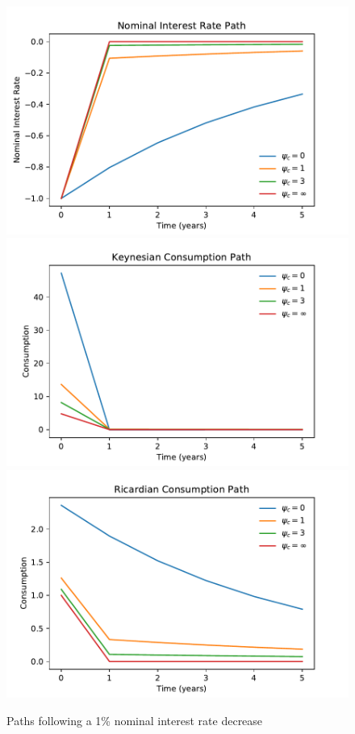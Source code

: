 \documentclass[12pt,a4paper]{article}
\begin{document}
\begin{figure} 
	\begin{centering}
		\includegraphics[scale=0.5]{../Python/DoloCode/Figures/TANK_capital_IRF_i.pdf}
		\includegraphics[scale=0.5]{../Python/DoloCode/Figures/TANK_capital_IRF_c_K.pdf}
		\includegraphics[scale=0.5]{../Python/DoloCode/Figures/TANK_capital_IRF_c_R.pdf}
		\caption{Paths following a 1\% nominal interest rate decrease}
		\label{fig:iandcpath}
	\end{centering}
\end{figure}
\end{document}
